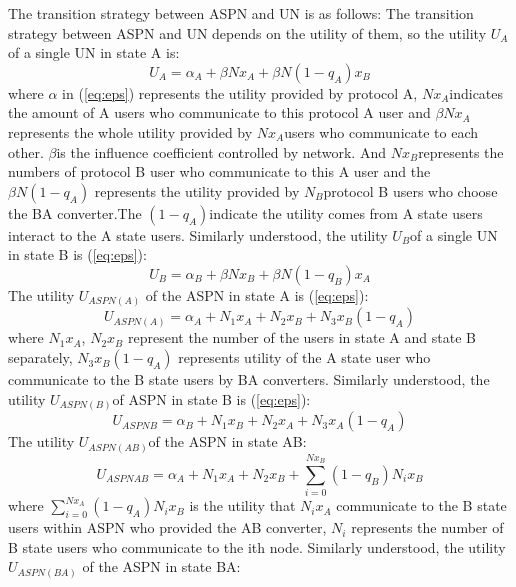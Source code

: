 \documentclass{article}
\begin{document}
The transition strategy between ASPN and UN is as follows:
The transition strategy between ASPN and UN depends on the utility of them, so the utility \(U_{A}\) of a single UN
in state A is:
\begin{displaymath} \label{eq:eps}
U_{A}=\alpha_{A}+\beta Nx_{A}+\beta N(1-q_{A})x_{B}
\end{displaymath}
where \(\alpha\) in (\ref{eq:eps}) represents the utility provided by protocol A, \(Nx_{A}\)indicates the amount of
A users who communicate to this protocol A user and \(\beta Nx_{A}\) represents the whole utility provided
by \(Nx_{A}\)users who communicate to each other. \(\beta\)is the influence coefficient controlled by network.
And \(Nx_{B}\)represents the numbers of protocol B user who communicate to this A user and the \(\beta N(1-q_{A})\)
represents the utility provided by \(N_{B}\)protocol B users who choose the BA converter.The \((1-q_{A})\)indicate the
utility comes from A state users interact to the A state users. Similarly understood, the utility \(U_{B}\)of a single UN in
state B is (\ref{eq:eps}):
\begin{displaymath}\label{eq:eps}
U_{B}=\alpha_{B}+\beta Nx_{B}+\beta N(1-q_{B})x_{A}
\end{displaymath}
The utility \(U_{ASPN(A)}\) of the ASPN in state A is (\ref{eq:eps}):
\begin{displaymath}\label{eq:eps}
U_{ASPN(A)}=\alpha_{A}+N_{1}x_{A}+N_{2}x_{B}+N_{3}x_{B}(1-q_{A})
\end{displaymath}
where \(N_{1}x_{A}\), \(N_{2}x_{B}\) represent the number of the users in state A and state B separately,
\(N_{3}x_{B}(1-q_{A})\) represents utility of the A state user who communicate to the B state users by
BA converters. Similarly understood, the utility \(U_{ASPN(B)}\)of ASPN in state B is (\ref{eq:eps}):
\begin{displaymath} \label{eq:eps}
U_{ASPN{B}}=\alpha_{B}+N_{1}x_{B}+N_{2}x_{A}+N_{3}x_{A}(1-q_{A})
\end{displaymath}
The utility \(U_{ASPN(AB)}\)of the ASPN in state AB:
\begin{displaymath}
U_{ASPN{AB}}=\alpha_{A}+N_{1}x_{A}+N_{2}x_{B}+\sum_{i=0}^{Nx_{B}}(1-q_{B})N_{i}x_{B}
\end{displaymath}
where \(\sum_{i=0}^{Nx_{A}}(1-q_{A})N_{i}x_{B}\) is the utility that \(N_{i}x_{A}\) communicate to the B
state users within ASPN who provided the AB converter, \(N_{i}\) represents the number of B state users
who communicate to the ith node.
Similarly understood, the utility \(U_{ASPN(BA)}\) of the ASPN in state BA:
\end{document}
